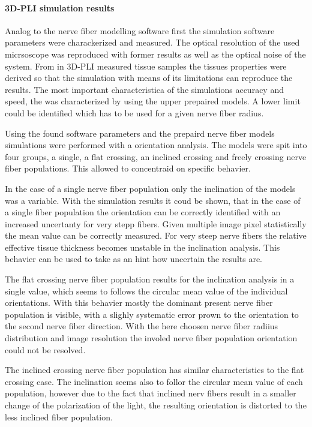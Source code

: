 \paragraph{\acs{3D-PLI} simulation results}
% 
Analog to the nerve fiber modelling software first the simulation software parameters were charackerized and measured.
The optical resolution of the used micrsoscope was reproduced with former results as well as the optical noise of the system.
From in \ac{3D-PLI} measured tissue samples the tissues properties were derived so that the simulation with means of its limitations can reproduce the results.
The most important characteristica of the simulations accuracy and speed, the \Voxelsize{} was characterized by using the upper prepaired models.
A lower limit could be identified which has to be used for a given nerve fiber radius.
\par
% 
Using the found software parameters and the prepaird nerve fiber models simulations were performed with a orientation analysis.
The models were spit into four groups, a single, a flat crossing, an inclined crossing and freely crossing nerve fiber populations.
This allowed to concentraid on specific behavier.
\par
% 
In the case of a single nerve fiber population only the inclination of the models was a variable.
With the simulation results it coud be shown, that in the case of a single fiber population the orientation can be correctly identified with an increased uncertanty for very stepp fibers.
Given multiple image pixel statistically the mean value can be correctly measured.
For very steep nerve fibers the relative effective tissue thickness becomes unstable in the inclination analysis.
This behavier can be used to take as an hint how uncertain the results are.
\par
% 
The flat crossing nerve fiber population results for the inclination analysis in a single value, which seems to follows the circular mean value of the individual orientations.
With this behavier mostly the dominant present nerve fiber population is visible, with a slighly systematic error prown to the orientation to the second nerve fiber direction.
With the here choosen nerve fiber radiius distribution and image resolution the involed nerve fiber population orientation could not be resolved.
\par
% 
The inclined crossing nerve fiber population has similar characteristics to the flat crossing case.
The inclination seems also to follor the circular mean value of each population, however due to the fact that inclined nerv fibers result in a smaller change of the polarization of the light, the resulting orientation is distorted to the less inclined fiber population.
